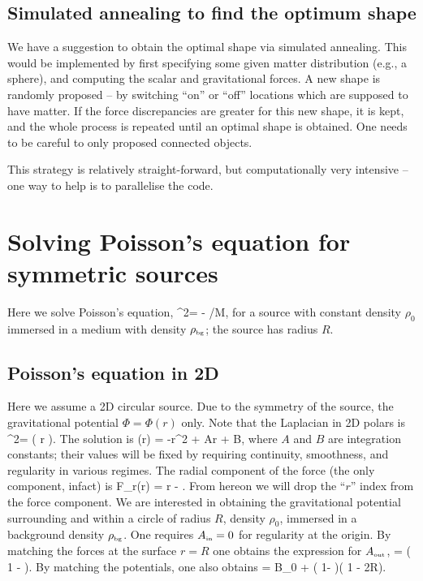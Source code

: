 \documentclass[a4paper, 12pt]{article}
\numberwithin{equation}{section}
\begin{document}
\subsection{Simulated annealing to find the optimum shape}
We have a suggestion to obtain the optimal shape via simulated annealing. This would be implemented by first specifying some given matter distribution (e.g., a sphere), and computing the scalar and gravitational forces. A new shape is randomly proposed -- by switching ``on'' or ``off'' locations which are supposed to have matter. If the force discrepancies are greater for this new shape, it is kept, and the whole process is repeated until an optimal shape is obtained. One needs to be careful to only proposed connected objects.

This strategy is relatively straight-forward, but computationally very intensive -- one way to help is to parallelise the code.
\section{Solving Poisson's equation for symmetric sources}
\label{poissonseqsoln}
Here we solve Poisson's equation, 
\bea
\nabla^2\Phi = - \rho /M,
\eea
for a source with constant density $\rho_0$ immersed in a medium with density ${\rho}_{\scriptscriptstyle{\textrm{bg}}}$; the source has radius $R$.
\subsection{Poisson's equation in 2D}

Here we assume a 2D  circular source. Due to the symmetry of the source, the gravitational potential $\Phi = \Phi(r)$ only. Note that the Laplacian in 2D polars is
\bea
\nabla^2\Phi = \left( r \right).
\eea
The solution is
\bea
\Phi(r) = -r^2 + A\ln r + B,
\eea
where $A$ and $B$ are integration constants; their values will be fixed by requiring continuity, smoothness, and regularity in various regimes. The radial component of the force (the only component, infact) is
\bea
F_r(r) =  r - .
\eea
From hereon we will drop the ``$r$'' index from the force component.
We are interested in obtaining the gravitational potential surrounding and within a circle of radius $R$, density $\rho_0$, immersed in a background density ${\rho}_{\scriptscriptstyle{\textrm{bg}}}$. One requires ${A}_{\scriptscriptstyle{\textrm{in}}}=0$ for regularity at the origin. By matching the forces at the surface $r=R$ one obtains the   expression for ${A}_{\scriptscriptstyle{\textrm{out}}}$,
\bse
\bea
{} = \left( 1 - \right).
\eea
By matching the potentials, one also obtains
\bea
{} = B_0 + \left( 1- \right)\left( 1 - 2\ln R\right).
\eea
\ese
\end{document}
